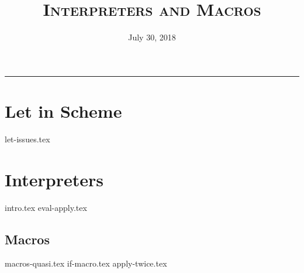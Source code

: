 \documentclass{exam}
\title{\textsc{Interpreters and Macros}}
\date{July 30, 2018}
\begin{document}
\maketitle
\rule{\textwidth}{0.15em}
\fontsize{12}{15}\selectfont


\section{Let in Scheme}
\begin{questions}
{let-issues.tex}


\newpage

\section{Interpreters}
{intro.tex}
{eval-apply.tex}
\end{questions}

\begin{questions}
\section{Macros}
{macros-quasi.tex}
{if-macro.tex}
{apply-twice.tex}
\end{questions}




\end{document}
